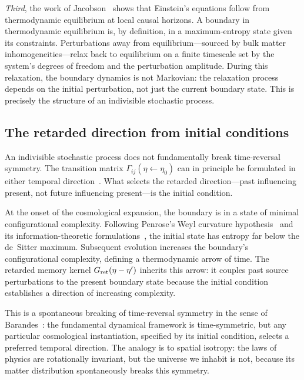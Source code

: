 \documentclass[aps,prd,twocolumn,superscriptaddress,nofootinbib]{revtex4-2}
\begin{document}
\emph{Third}, the work of Jacobson~\cite{Jacobson1995} shows that Einstein's equations follow from thermodynamic equilibrium at local causal horizons. A boundary in thermodynamic equilibrium is, by definition, in a maximum-entropy state given its constraints. Perturbations away from equilibrium---sourced by bulk matter inhomogeneities---relax back to equilibrium on a finite timescale set by the system's degrees of freedom and the perturbation amplitude. During this relaxation, the boundary dynamics is not Markovian: the relaxation process depends on the initial perturbation, not just the current boundary state. This is precisely the structure of an indivisible stochastic process.

\subsection{The retarded direction from initial conditions}

An indivisible stochastic process does not fundamentally break time-reversal symmetry. The transition matrix $\Gamma_{ij}(\eta \leftarrow \eta_0)$ can in principle be formulated in either temporal direction~\cite{Barandes2025SQC}. What selects the retarded direction---past influencing present, not future influencing present---is the initial condition.

At the onset of the cosmological expansion, the boundary is in a state of minimal configurational complexity. Following Penrose's Weyl curvature hypothesis~\cite{Penrose1979} and its information-theoretic formulations~\cite{Carroll2010}, the initial state has entropy far below the de~Sitter maximum. Subsequent evolution increases the boundary's configurational complexity, defining a thermodynamic arrow of time. The retarded memory kernel $G_{\rm ret}(\eta - \eta')$ inherits this arrow: it couples past source perturbations to the present boundary state because the initial condition establishes a direction of increasing complexity.

This is a spontaneous breaking of time-reversal symmetry in the sense of Barandes~\cite{Barandes2025SQC}: the fundamental dynamical framework is time-symmetric, but any particular cosmological instantiation, specified by its initial condition, selects a preferred temporal direction. The analogy is to spatial isotropy: the laws of physics are rotationally invariant, but the universe we inhabit is not, because its matter distribution spontaneously breaks this symmetry.


\end{document}
